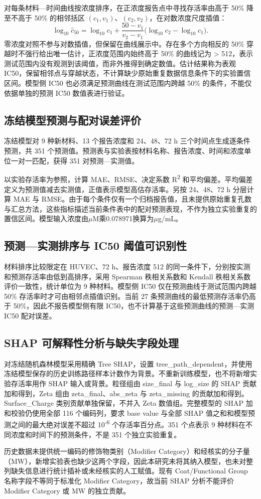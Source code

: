 对每条材料—时间曲线按浓度排序，在正浓度报告点中寻找存活率由高于 50\% 降至不高于 50\% 的相邻括区 $(c_1,v_1)$、$(c_2,v_2)$，在对数浓度尺度插值：
\begin{equation}
\log_{10}\widehat c_{50}=\log_{10}c_1+
\frac{50-v_1}{v_2-v_1}\bigl(\log_{10}c_2-\log_{10}c_1\bigr).
\end{equation}
零浓度对照不参与对数插值，但保留在曲线展示中。存在多个方向相反的 50\% 穿越时不强行给出唯一估计，正浓度范围内始终高于 50\% 的曲线记为 > 512，表示测试范围内没有观测到该阈值，而非外推得到确定数值。估计结果称为表观 IC50，保留相邻点与穿越状态，不计算缺少原始重复数据信息条件下的实验置信区间。模型侧 IC50 也必须满足预测曲线在测试范围内跨越 50\% 的条件，不能仅依据单独的预测 IC50 数值表进行验证。

\subsection{冻结模型预测与配对误差评价}

冻结模型对 9 种新材料、13 个报告浓度和 24、48、72 h 三个时间点生成逐条件预测，共 351 个预测值。预测表与实验表按材料名称、报告浓度、时间和浓度单位一对一匹配，获得 351 对预测—实测值。

以实验存活率为参照，计算 MAE、RMSE、决定系数 R\textsuperscript{2} 和平均偏差。平均偏差定义为预测值减去实测值，正值表示模型高估存活率。另按 24、48、72 h 分层计算 MAE 与 RMSE。由于每个条件仅有一个归档报告值，且未提供原始重复孔数与汇总方法，这些指标描述当前条件表中的配对预测表现，不作为独立实验重复的置信区间。模型输入浓度由$\mu$M乘0.078971换算为$\mu$g/mL。

\subsection{预测—实测排序与 IC50 阈值可识别性}

材料排序比较限定在 HUVEC、72 h、报告浓度 512 的同一条件下，分别按实测和预测存活率由低到高排序，采用 Spearman 秩相关系数和 Kendall 秩相关系数评价一致性，统计单位为 9 种材料。模型侧 IC50 仅在预测曲线于测试范围内跨越 50\% 存活率时才可由相邻点插值识别。当前 27 条预测曲线的最低预测存活率仍高于 50\%，因此不报告模型侧有限 IC50，也不计算基于这些预测曲线的预测—实测 IC50 配对误差。

\subsection{SHAP 可解释性分析与缺失字段处理}

对冻结随机森林模型采用精确 Tree SHAP，设置 tree\_path\_dependent，并使用冻结模型保存的历史训练路径样本计数作为背景。不重新训练模型，也不将新增实验存活率用作 SHAP 输入或背景。粒径组由 size\_final 与 log\_size 的 SHAP 贡献加和得到，Zeta 组由 zeta\_final、abs\_zeta 与 zeta\_missing 的贡献加和得到。Surface\_Charge 类别贡献单独保留，不并入 Zeta 数值组。完整模型的 SHAP 加和校验仍使用全部 116 个编码列，要求 base value 与全部 SHAP 值之和和模型预测之间的最大绝对误差不超过 10\textsuperscript{-}\textsuperscript{6} 个存活率百分点。351 个点表示 9 种材料在不同浓度和时间下的预测条件，不是 351 个独立实验重复。

历史数据未提供统一编码的修饰物类别（Modifier Category）和经核实的分子量（MW），新增实验表也缺少这两个字段，因此本研究未将其纳入模型，也未对整列缺失信息进行统计插补或未经核实的人工赋值。现有 Coat/Functional Group 名称字段不等同于标准化 Modifier Category，故当前 SHAP 分析不能评价 Modifier Category 或 MW 的独立贡献。
